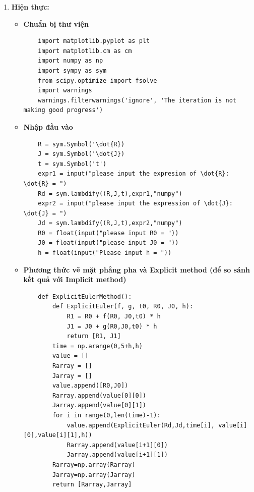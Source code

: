 \documentclass[a4paper]{article}
\begin{document}
\begin{enumerate}
    \item \textbf{Hiện thực:} 
    \begin{itemize}
        \item \textbf{Chuẩn bị thư viện}
        \begin{lstlisting}
    import matplotlib.pyplot as plt
    import matplotlib.cm as cm
    import numpy as np
    import sympy as sym
    from scipy.optimize import fsolve
    import warnings
    warnings.filterwarnings('ignore', 'The iteration is not making good progress')
        \end{lstlisting}
        \item \textbf{Nhập đầu vào}
        \begin{lstlisting}
    R = sym.Symbol('\dot{R})
    J = sym.Symbol('\dot{J})
    t = sym.Symbol('t')
    expr1 = input("please input the expresion of \dot{R}: \dot{R} = ")
    Rd = sym.lambdify((R,J,t),expr1,"numpy")
    expr2 = input("please input the expression of \dot{J}: \dot{J} = ")
    Jd = sym.lambdify((R,J,t),expr2,"numpy")
    R0 = float(input("please input R0 = "))
    J0 = float(input("please input J0 = "))
    h = float(input("Please input h = "))
        \end{lstlisting}
        \item \textbf{Phương thức vẽ mặt phẳng pha và Explicit method (để so sánh kết quả với Implicit method)}
        \begin{lstlisting}
    def ExplicitEulerMethod():
        def ExplicitEuler(f, g, t0, R0, J0, h):
            R1 = R0 + f(R0, J0,t0) * h
            J1 = J0 + g(R0,J0,t0) * h
            return [R1, J1]
        time = np.arange(0,5+h,h)
        value = []
        Rarray = []
        Jarray = []
        value.append([R0,J0])
        Rarray.append(value[0][0])
        Jarray.append(value[0][1])
        for i in range(0,len(time)-1):
            value.append(ExplicitEuler(Rd,Jd,time[i], value[i][0],value[i][1],h))
            Rarray.append(value[i+1][0])
            Jarray.append(value[i+1][1])
        Rarray=np.array(Rarray)
        Jarray=np.array(Jarray)
        return [Rarray,Jarray]
      

\end{lstlisting}
\end{itemize}
\end{enumerate}
\end{document}
